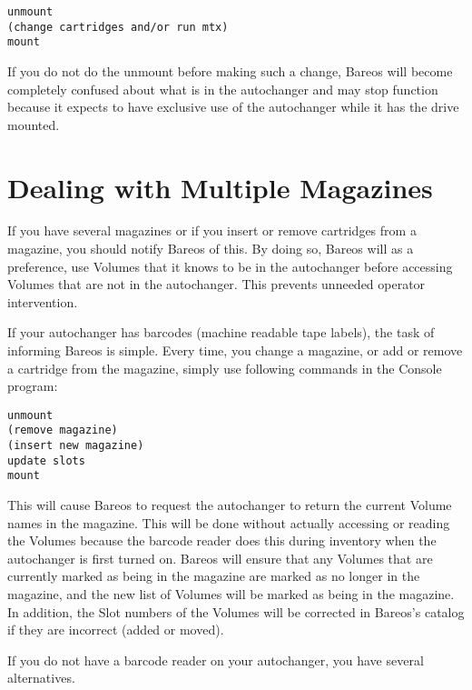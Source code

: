 \footnotesize
\begin{verbatim}
unmount
(change cartridges and/or run mtx)
mount
\end{verbatim}
\normalsize

If you do not do the unmount before making such a change, Bareos
will become completely confused about what is in the autochanger
and may stop function because it expects to have exclusive use
of the autochanger while it has the drive mounted.


\label{Magazines}
\section{Dealing with Multiple Magazines}

If you have several magazines or if you insert or remove cartridges from a
magazine, you should notify Bareos of this. By doing so, Bareos will as
a preference, use Volumes that it knows to be in the autochanger before
accessing Volumes that are not in the autochanger. This prevents unneeded
operator intervention.

If your autochanger has barcodes (machine readable tape labels), the task of
informing Bareos is simple. Every time, you change a magazine, or add or
remove a cartridge from the magazine, simply use following commands in the Console program:

\footnotesize
\begin{verbatim}
unmount
(remove magazine)
(insert new magazine)
update slots
mount
\end{verbatim}
\normalsize

This will cause Bareos to request the autochanger to
return the current Volume names in the magazine. This will be done without
actually accessing or reading the Volumes because the barcode reader does this
during inventory when the autochanger is first turned on. Bareos will ensure
that any Volumes that are currently marked as being in the magazine are marked
as no longer in the magazine, and the new list of Volumes will be marked as
being in the magazine. In addition, the Slot numbers of the Volumes will be
corrected in Bareos's catalog if they are incorrect (added or moved).

If you do not have a barcode reader on your autochanger, you have several
alternatives.

